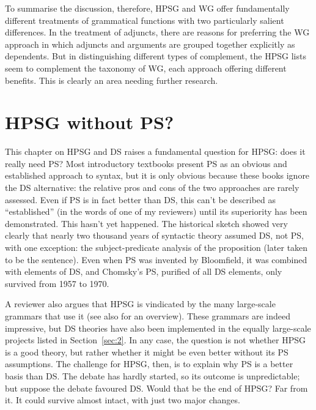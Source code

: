 \documentclass[output=paper
 	        ,biblatex
                ,babelshorthands
                ,newtxmath
                ,draftmode
                ,colorlinks, citecolor=brown
]{langscibook}
\begin{document}
To summarise the discussion, therefore, HPSG and WG offer fundamentally different treatments of
grammatical functions with two particularly salient differences. In the treatment of adjuncts, there
are reasons for preferring the WG approach in which adjuncts and arguments are grouped together
explicitly as dependents. But in distinguishing different types of complement, the HPSG lists seem
to complement the taxonomy of WG, each approach offering different benefits. This is clearly an area
needing further research.


\section{HPSG without PS?}
\label{sec:6}

This chapter on HPSG and DS raises a fundamental question for HPSG: does it really need PS? Most
introductory textbooks present PS as an obvious and established approach to syntax, but it is only
obvious because these books ignore the DS alternative: the relative pros and cons of the two
approaches are rarely assessed. Even if PS is in fact better than DS, this can't be described as
``established'' (in the words of one of my reviewers) until its superiority has been
demonstrated. This hasn't yet happened. The historical sketch showed very clearly that nearly two
thousand years of syntactic theory assumed DS, not PS, with one exception: the subject-predicate
analysis of the proposition (later taken to be the sentence). Even when PS was invented by
Bloomfield, it was combined with elements of DS, and Chomsky's PS, purified of all DS elements, only
survived from 1957 to 1970.

A reviewer also argues that HPSG is vindicated by the many large-scale grammars that use it (see
also  for an overview). These
grammars are indeed impressive, but DS theories have also been implemented in the equally
large-scale projects listed in Section~\ref{sec:2}. In any case, the question is not whether HPSG is
a good theory, but rather whether it might be even better without its PS assumptions. The challenge
for HPSG, then, is to explain why PS is a better basis than DS. The debate has hardly started, so
its outcome is unpredictable; but suppose the debate favoured DS. Would that be the end of HPSG? Far
from it. It could survive almost intact, with just two major changes.
\end{document}
